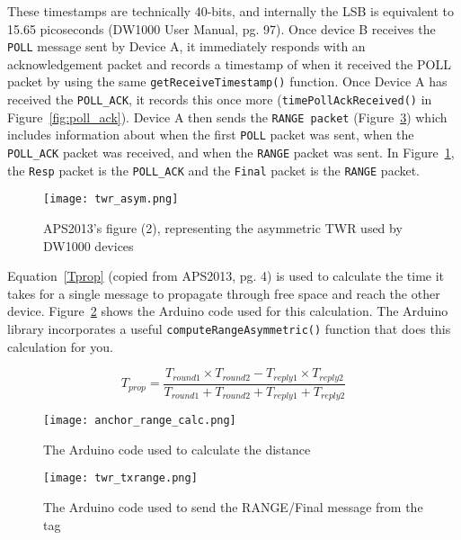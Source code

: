 \documentclass{article}
\begin{document}
These timestamps are technically 40-bits, and internally the LSB is equivalent to 15.65 picoseconds (DW1000 User Manual, pg. 97). Once device B receives the \texttt{POLL} message sent by Device A, it immediately responds with an acknowledgement packet and records a timestamp of when it received the POLL packet by using the same \texttt{getReceiveTimestamp()} function. Once Device A has received the \texttt{POLL\_ACK}, it records this once more (\texttt{timePollAckReceived()} in Figure~\ref{fig:poll_ack}). Device A then sends the \texttt{RANGE packet} (Figure~\ref{fig:tx_range_fn}) which includes information about when the first \texttt{POLL} packet was sent, when the \texttt{POLL\_ACK} packet was received, and when the \texttt{RANGE} packet was sent. In Figure~\ref{fig:aps2013_twr_asym}, the \texttt{Resp} packet is the \texttt{POLL\_ACK} and the \texttt{Final} packet is the \texttt{RANGE} packet. 

\begin{figure}[h]
    \centering
    \texttt{[image: twr\_asym.png]}
    \caption{APS2013's figure (2), representing the asymmetric TWR used by DW1000 devices}
    \label{fig:aps2013_twr_asym}
\end{figure}

Equation~\ref{Tprop} (copied from APS2013, pg. 4) is used to calculate the time it takes for a single message to propagate through free space and reach the other device. Figure~\ref{fig:calc_range} shows the Arduino code used for this calculation. The Arduino library incorporates a useful \texttt{computeRangeAsymmetric()} function that does this calculation for you. 

\begin{equation}\label{Tprop}
T_{prop} = \frac{T_{round1} \times T_{round2} - T_{reply1}\times T_{reply2}} {T_{round1} + T_{round2} + T_{reply1} + T_{reply2}}
\end{equation}

\begin{figure}[h]
    \centering
    \texttt{[image: anchor\_range\_calc.png]}
    \caption{The Arduino code used to calculate the distance}
    \label{fig:calc_range}
\end{figure}

\begin{figure}[h]
    \centering
    \texttt{[image: twr\_txrange.png]}
    \caption{The Arduino code used to send the RANGE/Final message from the tag}
    \label{fig:tx_range_fn}
\end{figure}
\end{document}
